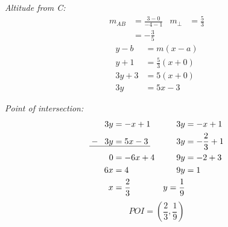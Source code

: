 \begin{enumerate}
	\textit{Altitude from C:}
	\begin{align*}
		m_{AB}&=\frac{3-0}{-4-1} & m_\perp&=\frac{5}{3} \\
		&=-\frac{3}{5}
	\end{align*}
	\begin{align*}
		y-b&=m(x-a)\\
		y+1&=\frac{5}{3}\left(x+0\right)\\
		3y+3&=5\left(x+0\right)\\
		3y&=5x-3
	\end{align*}
	
	\textit{Point of intersection:}
	\begin{align*}
		3y&=-x+1 & 3y&=-x+1\\
		\makebox[0pt][l]{\uline{\phantom{$--3y=5x-3$}}}
		-\;\;3y&=5x-3 & 3y&=-\frac{2}{3}+1\\
		0&=-6x+4 & 9y&=-2+3\\
		6x&=4 & 9y&=1\\
		x&=\frac{2}{3} & y=\frac{1}{9}\\
	\end{align*}
	\begin{equation*}
		POI = \left(\frac{2}{3},\frac{1}{9}\right)
	\end{equation*}
\end{enumerate}